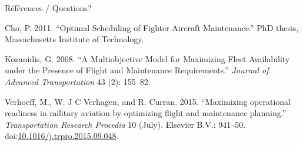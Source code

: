 \documentclass[ignorenonframetext,]{beamer}
\begin{document}
\begin{frame}{Références / Questions?}

\hypertarget{refs}{}
\hypertarget{ref-Cho2011}{}
Cho, P. 2011. ``Optimal Scheduling of Fighter Aircraft Maintenance.''
PhD thesis, Massachusetts Institute of Technology.

\hypertarget{ref-Kozanidis2008}{}
Kozanidis, G. 2008. ``A Multiobjective Model for Maximizing Fleet
Availability under the Presence of Flight and Maintenance
Requirements.'' \emph{Journal of Advanced Transportation} 43 (2):
155--82.

\hypertarget{ref-Verhoeff2015}{}
Verhoeff, M., W. J C Verhagen, and R. Curran. 2015. ``Maximizing
operational readiness in military aviation by optimizing flight and
maintenance planning.'' \emph{Transportation Research Procedia} 10
(July). Elsevier B.V.: 941--50.
doi:\href{https://doi.org/10.1016/j.trpro.2015.09.048}{10.1016/j.trpro.2015.09.048}.

\end{frame}
\end{document}
